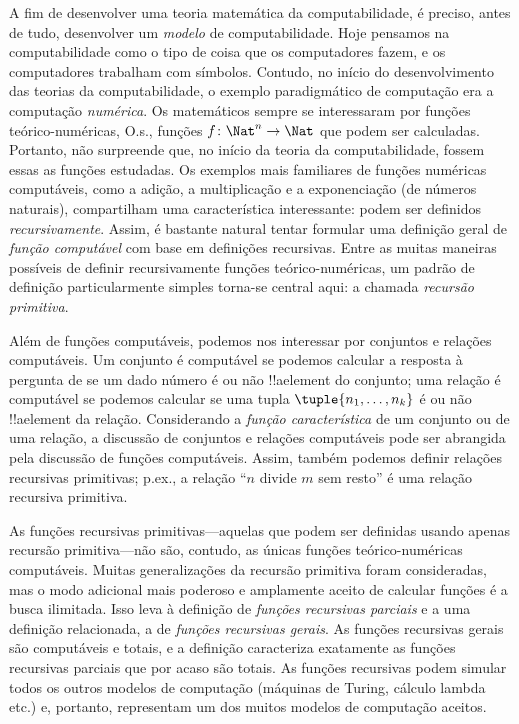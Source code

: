 \documentclass[../../../include/open-logic-section]{subfiles}
\begin{document}

A fim de desenvolver uma teoria matemática da computabilidade, é preciso,
antes de tudo, desenvolver um \emph{modelo} de computabilidade. Hoje pensamos
na computabilidade como o tipo de coisa que os computadores fazem, e os
computadores trabalham com símbolos. Contudo, no início do desenvolvimento
das teorias da computabilidade, o exemplo paradigmático de computação era a
computação \emph{numérica}. Os matemáticos sempre se interessaram por funções
teórico-numéricas, O.s.\@, funções $f\colon \Nat^n \to \Nat$ que podem ser
calculadas. Portanto, não surpreende que, no início da teoria da
computabilidade, fossem essas as funções estudadas. Os exemplos mais
familiares de funções numéricas computáveis, como a adição, a multiplicação e
a exponenciação (de números naturais), compartilham uma característica
interessante: podem ser definidos \emph{recursivamente}. Assim, é bastante
natural tentar formular uma definição geral de \emph{função computável} com
base em definições recursivas. Entre as muitas maneiras possíveis de definir
recursivamente funções teórico-numéricas, um padrão de definição
particularmente simples torna-se central aqui: a chamada \emph{recursão
primitiva}.

Além de funções computáveis, podemos nos interessar por conjuntos e relações
computáveis. Um conjunto é computável se podemos calcular a resposta à
pergunta de se um dado número é ou não !!a{element} do conjunto; uma relação
é computável se podemos calcular se uma tupla
$\tuple{n_1, \dots, n_k}$ é ou não !!a{element} da relação. Considerando a
\emph{função característica} de um conjunto ou de uma relação, a discussão
de conjuntos e relações computáveis pode ser abrangida pela discussão de
funções computáveis. Assim, também podemos definir relações recursivas
primitivas; p.ex., a relação ``$n$ divide $m$ sem resto'' é uma relação
recursiva primitiva.

As funções recursivas primitivas---aquelas que podem ser definidas usando
apenas recursão primitiva---não são, contudo, as únicas funções
teórico-numéricas computáveis. Muitas generalizações da recursão primitiva
foram consideradas, mas o modo adicional mais poderoso e amplamente aceito
de calcular funções é a busca ilimitada. Isso leva à definição de
\emph{funções recursivas parciais} e a uma definição relacionada, a de
\emph{funções recursivas gerais}. As funções recursivas gerais são
computáveis e totais, e a definição caracteriza exatamente as funções
recursivas parciais que por acaso são totais. As funções recursivas podem
simular todos os outros modelos de computação (máquinas de Turing, cálculo
lambda etc.) e, portanto, representam um dos muitos modelos de computação
aceitos.
\end{document}
